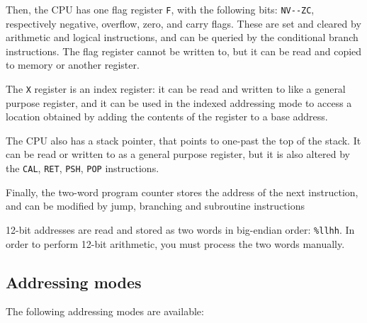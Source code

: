 \documentclass[a4paper,onecolumn,final,10pt]{memoir}
\let\ttt\texttt
\begin{document}
Then, the CPU has one flag register \ttt{F},
with the following bits: \verb|NV--ZC|, respectively negative, overflow, zero, and carry flags.
These are set and cleared by arithmetic and logical instructions,
and can be queried by the conditional branch instructions.
The flag register cannot be written to, but it can be read and copied to memory or another register.

The \ttt{X} register is an index register: it can be read and written to like a general purpose register,
and it can be used in the indexed addressing mode to access a location obtained by adding the contents of the register to a base address.

The CPU also has a stack pointer, that points to one-past the top of the stack.
It can be read or written to as a general purpose register, but it is also altered by the \ttt{CAL}, \ttt{RET}, \ttt{PSH}, \ttt{POP} instructions.

Finally, the two-word program counter stores the address of the next instruction, and can be modified by jump, branching and subroutine instructions

12-bit addresses are read and stored as two words in big-endian order: \ttt{\%llhh}.
In order to perform 12-bit arithmetic, you must process the two words manually.\footnotemark


\filbreak %
\subsection*{Addressing modes}

The following addressing modes are available:
\end{document}
